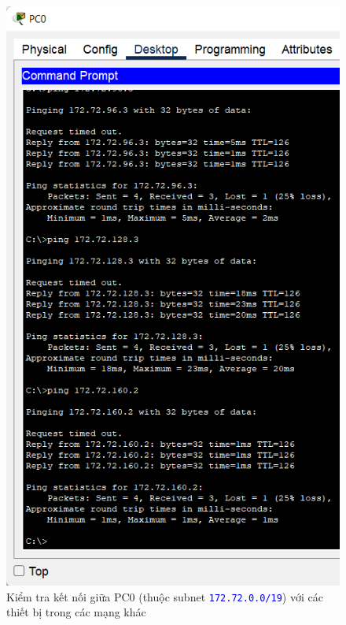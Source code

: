 \begin{enumerate}
\begin{enumerate}
\begin{figure}[H]
\begin{center}
\includegraphics[scale=.5]{../figures/p2/test-ping-2}
\end{center}
\caption{Kiểm tra kết nối giữa PC0 (thuộc subnet \texttt{\textcolor{blue}{172.72.0.0/19}}) với các thiết bị trong các mạng khác}
\end{figure}


\end{enumerate}
\end{enumerate}
